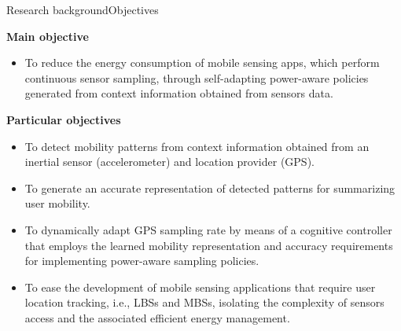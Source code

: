 \begin{frame}{Research background}{Objectives}
\small
\begin{block}{\small \textbf{Main objective}}
\begin{itemize}
  \item To reduce the energy consumption of mobile sensing apps, which perform continuous sensor sampling, through self-adapting power-aware policies generated from context information obtained from sensors data.
\end{itemize}
\end{block}

\begin{block}{\small \textbf{Particular objectives}}
\begin{itemize}
  \item To detect mobility patterns from context information obtained from an inertial sensor (accelerometer) and location provider (GPS).
  \item To generate an accurate representation of detected patterns for summarizing user mobility.
  \item To dynamically adapt GPS sampling rate by means of a cognitive controller that employs the learned mobility representation and accuracy requirements for implementing power-aware sampling policies.
  \item To ease the development of mobile sensing applications that require user location tracking, i.e., LBSs and MBSs, isolating the complexity of sensors access and the associated efficient energy management.
\end{itemize}
\end{block}
\end{frame}



